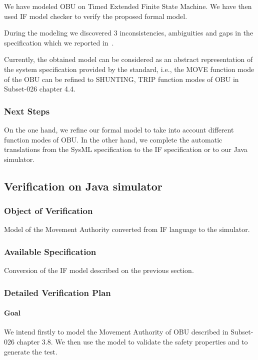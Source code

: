 We have modeled OBU on Timed Extended Finite State Machine.
We have then used IF model checker to verify the
proposed formal model. 

During the modeling we discovered 3 inconsistencies, ambiguities and gaps in the specification
which we reported in~\cite{specfindingsTSP}.


Currently, the obtained model can be considered as an abstract representation
of the system specification provided by the standard, i.e., the MOVE
function mode of the OBU can be refined to SHUNTING, TRIP function modes of
OBU in Subset-026 chapter 4.4.


\subsubsection{Next Steps}

On the one hand, we refine our formal model to take into account different
function modes of OBU.
In the other hand, we complete the automatic translations from the SysML
specification to the IF specification or to our Java simulator.

\subsection{Verification on Java simulator}

\subsubsection{Object of Verification}
Model of the Movement Authority converted from IF language to the simulator.

\subsubsection{Available Specification}
Conversion of the IF model described on the previous section.

\subsubsection{Detailed Verification Plan}

\paragraph{Goal} 
We intend firstly to model the Movement Authority of OBU described in
Subset-026 chapter 3.8. We then use the model to validate the safety
properties and to generate the test.

